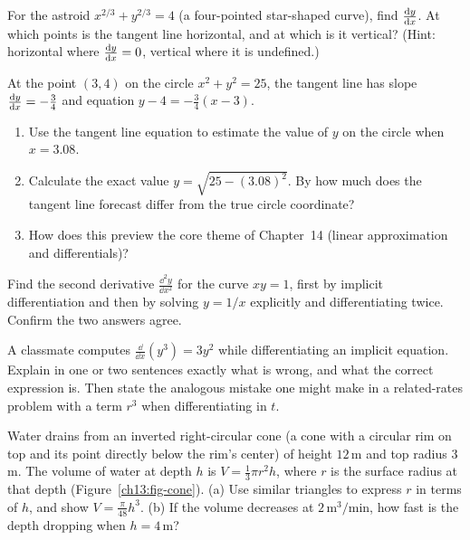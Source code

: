 \begin{exercise}
For the astroid $x^{2/3} + y^{2/3} = 4$ (a four-pointed star-shaped curve), find $\frac{\mathrm{d} y}{\mathrm{d} x}$. At which points is the tangent line
horizontal, and at which is it vertical? (Hint: horizontal where $\frac{\mathrm{d} y}{\mathrm{d} x}=0$, vertical where it is
undefined.)
\end{exercise}

\begin{exercise}
At the point $(3,4)$ on the circle $x^2 + y^2 = 25$, the tangent line has slope $\frac{\mathrm{d} y}{\mathrm{d} x} = -\tfrac{3}{4}$ and equation $y - 4 = -\tfrac{3}{4}(x - 3)$.
\begin{enumerate}[label=(\alph*)]
\item Use the tangent line equation to estimate the value of $y$ on the circle when $x = 3.08$.
\item Calculate the exact value $y = \sqrt{25 - (3.08)^2}$. By how much does the tangent line forecast differ from the true circle coordinate?
\item How does this preview the core theme of Chapter~14 (linear approximation and differentials)?
\end{enumerate}
\end{exercise}

\begin{exercise}
Find the second derivative $\frac{\dd^2 y}{\dd x^2}$ for the curve $xy = 1$, first by implicit
differentiation and then by solving $y = 1/x$ explicitly and differentiating twice. Confirm the two
answers agree.
\end{exercise}

\begin{exercise}[Conceptual]
A classmate computes $\frac{\dd}{\dd x}(y^3) = 3y^2$ while differentiating an implicit equation.
Explain in one or two sentences exactly what is wrong, and what the correct expression is. Then state
the analogous mistake one might make in a related-rates problem with a term $r^3$ when differentiating
in $t$.
\end{exercise}

\begin{exercise}
Water drains from an inverted right-circular cone (a cone with a circular rim on top and its point
directly below the rim's center) of height $12$\,m and top radius
$3$\,m. The volume of water at depth $h$ is $V = \tfrac{1}{3}\pi r^2 h$, where $r$ is the surface
radius at that depth (Figure~\ref{ch13:fig-cone}). (a) Use similar triangles to express $r$ in terms of $h$, and show
$V = \tfrac{\pi}{48}h^3$. (b) If the volume decreases at $2\,\text{m}^3/\text{min}$, how fast is the depth dropping
when $h = 4$\,m?
\end{exercise}

